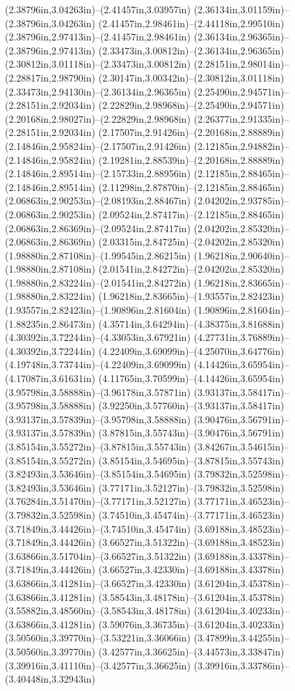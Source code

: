(2.38796in,3.04263in)--(2.41457in,3.03957in) (2.36134in,3.01159in)--(2.38796in,3.04263in) (2.41457in,2.98461in)--(2.44118in,2.99510in) (2.38796in,2.97413in)--(2.41457in,2.98461in) (2.36134in,2.96365in)--(2.38796in,2.97413in) (2.33473in,3.00812in)--(2.36134in,2.96365in) (2.30812in,3.01118in)--(2.33473in,3.00812in) (2.28151in,2.98014in)--(2.28817in,2.98790in) (2.30147in,3.00342in)--(2.30812in,3.01118in) (2.33473in,2.94130in)--(2.36134in,2.96365in) (2.25490in,2.94571in)--(2.28151in,2.92034in) (2.22829in,2.98968in)--(2.25490in,2.94571in) (2.20168in,2.98027in)--(2.22829in,2.98968in) (2.26377in,2.91335in)--(2.28151in,2.92034in) (2.17507in,2.91426in)--(2.20168in,2.88889in) (2.14846in,2.95824in)--(2.17507in,2.91426in) (2.12185in,2.94882in)--(2.14846in,2.95824in) (2.19281in,2.88539in)--(2.20168in,2.88889in) (2.14846in,2.89514in)--(2.15733in,2.88956in) (2.12185in,2.88465in)--(2.14846in,2.89514in) (2.11298in,2.87870in)--(2.12185in,2.88465in) (2.06863in,2.90253in)--(2.08193in,2.88467in) (2.04202in,2.93785in)--(2.06863in,2.90253in) (2.09524in,2.87417in)--(2.12185in,2.88465in) (2.06863in,2.86369in)--(2.09524in,2.87417in) (2.04202in,2.85320in)--(2.06863in,2.86369in) (2.03315in,2.84725in)--(2.04202in,2.85320in) (1.98880in,2.87108in)--(1.99545in,2.86215in) (1.96218in,2.90640in)--(1.98880in,2.87108in) (2.01541in,2.84272in)--(2.04202in,2.85320in) (1.98880in,2.83224in)--(2.01541in,2.84272in) (1.96218in,2.83665in)--(1.98880in,2.83224in) (1.96218in,2.83665in)--(1.93557in,2.82423in) (1.93557in,2.82423in)--(1.90896in,2.81604in) (1.90896in,2.81604in)--(1.88235in,2.86473in) (4.35714in,3.64294in)--(4.38375in,3.81688in) (4.30392in,3.72244in)--(4.33053in,3.67921in) (4.27731in,3.76889in)--(4.30392in,3.72244in) (4.22409in,3.69099in)--(4.25070in,3.64776in) (4.19748in,3.73744in)--(4.22409in,3.69099in) (4.14426in,3.65954in)--(4.17087in,3.61631in) (4.11765in,3.70599in)--(4.14426in,3.65954in) (3.95798in,3.58888in)--(3.96178in,3.57871in) (3.93137in,3.58417in)--(3.95798in,3.58888in) (3.92250in,3.57760in)--(3.93137in,3.58417in) (3.93137in,3.57839in)--(3.95798in,3.58888in) (3.90476in,3.56791in)--(3.93137in,3.57839in) (3.87815in,3.55743in)--(3.90476in,3.56791in) (3.85154in,3.55272in)--(3.87815in,3.55743in) (3.84267in,3.54615in)--(3.85154in,3.55272in) (3.85154in,3.54695in)--(3.87815in,3.55743in) (3.82493in,3.53646in)--(3.85154in,3.54695in) (3.79832in,3.52598in)--(3.82493in,3.53646in) (3.77171in,3.52127in)--(3.79832in,3.52598in) (3.76284in,3.51470in)--(3.77171in,3.52127in) (3.77171in,3.46523in)--(3.79832in,3.52598in) (3.74510in,3.45474in)--(3.77171in,3.46523in) (3.71849in,3.44426in)--(3.74510in,3.45474in) (3.69188in,3.48523in)--(3.71849in,3.44426in) (3.66527in,3.51322in)--(3.69188in,3.48523in) (3.63866in,3.51704in)--(3.66527in,3.51322in) (3.69188in,3.43378in)--(3.71849in,3.44426in) (3.66527in,3.42330in)--(3.69188in,3.43378in) (3.63866in,3.41281in)--(3.66527in,3.42330in) (3.61204in,3.45378in)--(3.63866in,3.41281in) (3.58543in,3.48178in)--(3.61204in,3.45378in) (3.55882in,3.48560in)--(3.58543in,3.48178in) (3.61204in,3.40233in)--(3.63866in,3.41281in) (3.59076in,3.36735in)--(3.61204in,3.40233in) (3.50560in,3.39770in)--(3.53221in,3.36066in) (3.47899in,3.44255in)--(3.50560in,3.39770in) (3.42577in,3.36625in)--(3.44573in,3.33847in) (3.39916in,3.41110in)--(3.42577in,3.36625in) (3.39916in,3.33786in)--(3.40448in,3.32943in) 